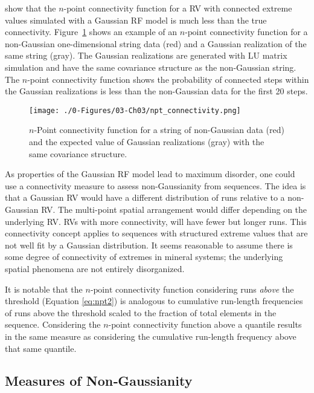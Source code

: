 \cite{journel1989nongaussian} show that the $n\text{-point}$ connectivity function for a \gls{RV} with connected extreme values simulated with a Gaussian \gls{RF} model is much less than the true connectivity. Figure~\ref{fig:npt_connectivity} shows an example of an $n\text{-point}$ connectivity function for a non-Gaussian one-dimensional string data (red) and a Gaussian realization of the same string (gray). The Gaussian realizations are generated with LU matrix simulation \citep{davis1987production} and have the same covariance structure as the non-Gaussian string. The $n$-point connectivity function shows the probability of connected steps within the Gaussian realizations is less than the non-Gaussian data for the first 20 steps.

\begin{figure}[htb!]
    \centering
    \texttt{[image: ./0-Figures/03-Ch03/npt\_connectivity.png]}
    \caption{$n$-Point connectivity function for a string of non-Gaussian data (red) and the expected value of Gaussian realizations (gray) with the same covariance structure.}
    \label{fig:npt_connectivity}
\end{figure}

As properties of the Gaussian \gls{RF} model lead to maximum disorder, one could use a connectivity measure to assess non-Gaussianity from sequences. The idea is that a Gaussian \gls{RV} would have a different distribution of runs relative to a non-Gaussian \gls{RV}. The multi-point spatial arrangement would differ depending on the underlying \gls{RV}. \Glspl{RV} with more connectivity, will have fewer but longer runs. This connectivity concept applies to sequences with structured extreme values that are not well fit by a Gaussian distribution. It seems reasonable to assume there is some degree of connectivity of extremes in mineral systems; the underlying spatial phenomena are not entirely disorganized.

It is notable that the $n\text{-point}$ connectivity function considering runs \emph{above} the threshold (Equation \ref{eq:npt2}) is analogous to cumulative run-length frequencies of runs above the threshold scaled to the fraction of total elements in the sequence. Considering the $n\text{-point}$ connectivity function above a quantile results in the same measure as considering the cumulative run-length frequency above that same quantile.

\FloatBarrier
\subsection{Measures of Non‐Gaussianity}
\label{subsec:03ngmeasures}

